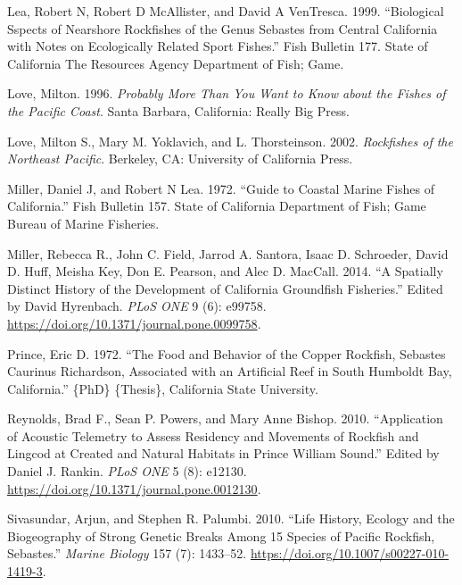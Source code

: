 \documentclass[11pt,
  english,
  letterpaper,
]{article}
\newlength{\cslhangindent}
\newenvironment{CSLReferences}[2] %
 {%
  \setlength{\parindent}{0pt}
  \ifodd #1 \everypar{\setlength{\hangindent}{\cslhangindent}}\ignorespaces\fi
  \ifnum #2 > 0
  \setlength{\parskip}{#2\baselineskip}
  \fi
 }%
 {}
\begin{document}
\begin{CSLReferences}{1}{0}
\leavevmode{}%
Lea, Robert N, Robert D McAllister, and David A VenTresca. 1999. {``Biological Sspects of Nearshore Rockfishes of the Genus Sebastes from {Central} {California} with Notes on Ecologically Related Sport Fishes.''} Fish Bulletin 177. State of California The Resources Agency Department of Fish; Game.

\leavevmode{}%
Love, Milton. 1996. \emph{Probably More Than You Want to Know about the Fishes of the {Pacific} {Coast}}. Santa Barbara, California: Really Big Press.

\leavevmode{}%
Love, Milton S., Mary M. Yoklavich, and L. Thorsteinson. 2002. \emph{Rockfishes of the {Northeast} {Pacific}}. Berkeley, CA: University of California Press.

\leavevmode{}%
Miller, Daniel J, and Robert N Lea. 1972. {``Guide to Coastal {Marine} {Fishes} of {California}.''} Fish Bulletin 157. State of California Department of Fish; Game Bureau of Marine Fisheries.

\leavevmode{}%
Miller, Rebecca R., John C. Field, Jarrod A. Santora, Isaac D. Schroeder, David D. Huff, Meisha Key, Don E. Pearson, and Alec D. MacCall. 2014. {``A {Spatially} {Distinct} {History} of the {Development} of {California} {Groundfish} {Fisheries}.''} Edited by David Hyrenbach. \emph{PLoS ONE} 9 (6): e99758. \url{https://doi.org/10.1371/journal.pone.0099758}.

\leavevmode{}%
Prince, Eric D. 1972. {``The Food and Behavior of the Copper Rockfish, {Sebastes} Caurinus {Richardson}, Associated with an Artificial Reef in {South} {Humboldt} {Bay}, {California}.''} \{PhD\} \{Thesis\}, California State University.

\leavevmode{}%
Reynolds, Brad F., Sean P. Powers, and Mary Anne Bishop. 2010. {``Application of {Acoustic} {Telemetry} to {Assess} {Residency} and {Movements} of {Rockfish} and {Lingcod} at {Created} and {Natural} {Habitats} in {Prince} {William} {Sound}.''} Edited by Daniel J. Rankin. \emph{PLoS ONE} 5 (8): e12130. \url{https://doi.org/10.1371/journal.pone.0012130}.

\leavevmode{}%
Sivasundar, Arjun, and Stephen R. Palumbi. 2010. {``Life History, Ecology and the Biogeography of Strong Genetic Breaks Among 15 Species of {Pacific} Rockfish, {Sebastes}.''} \emph{Marine Biology} 157 (7): 1433--52. \url{https://doi.org/10.1007/s00227-010-1419-3}.


\end{CSLReferences}
\end{document}
